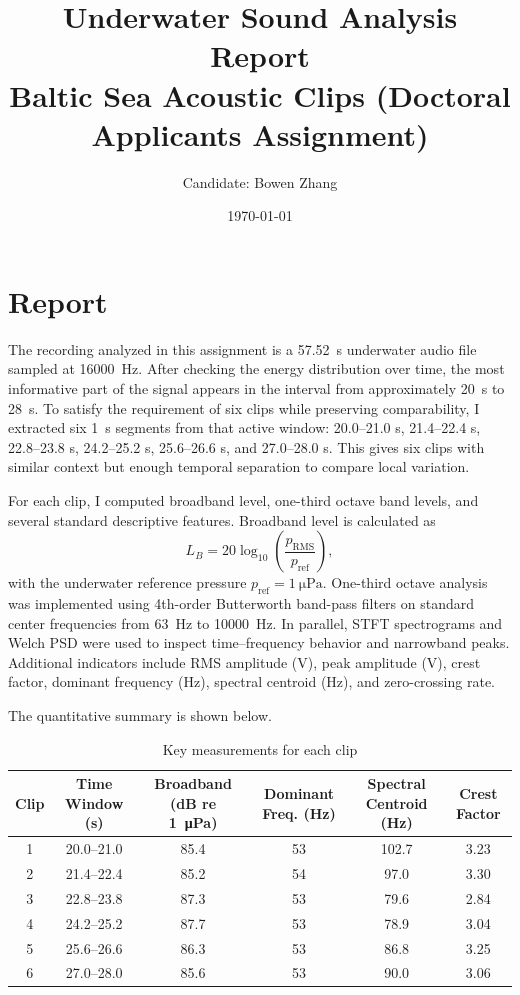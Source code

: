 \documentclass[11pt,a4paper]{article}
\title{Underwater Sound Analysis Report\\
\large Baltic Sea Acoustic Clips (Doctoral Applicants Assignment)}
\author{Candidate: Bowen Zhang}
\date{\today}
\begin{document}
\maketitle
\section*{Report}
The recording analyzed in this assignment is a \SI{57.52}{\second} underwater audio file sampled at \SI{16000}{\hertz}. After checking the energy distribution over time, the most informative part of the signal appears in the interval from approximately \SI{20}{\second} to \SI{28}{\second}. To satisfy the requirement of six clips while preserving comparability, I extracted six \SI{1}{\second} segments from that active window: 20.0--21.0 s, 21.4--22.4 s, 22.8--23.8 s, 24.2--25.2 s, 25.6--26.6 s, and 27.0--28.0 s. This gives six clips with similar context but enough temporal separation to compare local variation.

For each clip, I computed broadband level, one-third octave band levels, and several standard descriptive features. Broadband level is calculated as
\begin{equation}
L_B = 20\log_{10}\left(\frac{p_{\mathrm{RMS}}}{p_{\mathrm{ref}}}\right),
\end{equation}
with the underwater reference pressure $p_{\mathrm{ref}} = \SI{1}{\micro\pascal}$. One-third octave analysis was implemented using 4th-order Butterworth band-pass filters on standard center frequencies from \SI{63}{\hertz} to \SI{10000}{\hertz}. In parallel, STFT spectrograms and Welch PSD were used to inspect time--frequency behavior and narrowband peaks. Additional indicators include RMS amplitude (V), peak amplitude (V), crest factor, dominant frequency (Hz), spectral centroid (Hz), and zero-crossing rate.

The quantitative summary is shown below.

\begin{table}[H]
\centering
\caption{Key measurements for each clip}
\setlength{\tabcolsep}{3.5pt}
\renewcommand{\arraystretch}{0.95}
\footnotesize
\begin{tabular}{@{}cccccc@{}}
\toprule
Clip & Time Window (s) & Broadband (dB re \SI{1}{\micro\pascal}) & Dominant Freq. (Hz) & Spectral Centroid (Hz) & Crest Factor \\
\midrule
1 & 20.0--21.0 & 85.4 & 53 & 102.7 & 3.23 \\
2 & 21.4--22.4 & 85.2 & 54 & 97.0 & 3.30 \\
3 & 22.8--23.8 & 87.3 & 53 & 79.6 & 2.84 \\
4 & 24.2--25.2 & 87.7 & 53 & 78.9 & 3.04 \\
5 & 25.6--26.6 & 86.3 & 53 & 86.8 & 3.25 \\
6 & 27.0--28.0 & 85.6 & 53 & 90.0 & 3.06 \\
\bottomrule
\end{tabular}
\normalsize
\end{table}
\end{document}

